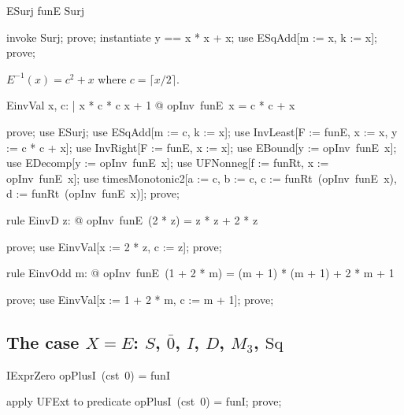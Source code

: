 \documentclass{article}
\begin{document}
\begin{theorem}{ESurj}
  funE \in Surj
\end{theorem}

\begin{zproof}
invoke Surj;
prove;
instantiate y == x * x + x;
use ESqAdd[m := x, k := x];
prove;
\end{zproof}

$E^{-1}(x) = c^2 + x$ where $c = \lceil x/2 \rceil$.

\begin{theorem}{EinvVal}
  \forall x, c: \nat | x  * c  * c \leq x + 1 @ opInv~funE~x = c * c + x
\end{theorem}

\begin{zproof}
prove;
use ESurj;
use ESqAdd[m := c, k := x];
use InvLeast[F := funE, x := x, y := c * c + x];
use InvRight[F := funE, x := x];
use EBound[y := opInv~funE~x];
use EDecomp[y := opInv~funE~x];
use UFNonneg[f := funRt, x := opInv~funE~x];
use timesMonotonic2[a := c, b := c, c := funRt~(opInv~funE~x), d := funRt~(opInv~funE~x)];
prove;
\end{zproof}

\begin{theorem}{rule EinvD}
  \forall z: \nat @ opInv~funE~(2 * z) = z * z + 2 * z
\end{theorem}

\begin{zproof}
prove;
use EinvVal[x := 2 * z, c := z];
prove;
\end{zproof}

\begin{theorem}{rule EinvOdd}
  \forall m: \nat @ opInv~funE~(1 + 2 * m) = (m + 1) * (m + 1) + 2 * m + 1
\end{theorem}

\begin{zproof}
prove;
use EinvVal[x := 1 + 2 * m, c := m + 1];
prove;
\end{zproof}

\subsection{The case $X = E$: $S$, $\bar 0$, $I$, $D$, $M_3$, $\mathrm{Sq}$}

\begin{theorem}{IExprZero}
  opPlusI~(cst~0) = funI
\end{theorem}

\begin{zproof}
apply UFExt to predicate opPlusI~(cst~0) = funI;
prove;
\end{zproof}
\end{document}
